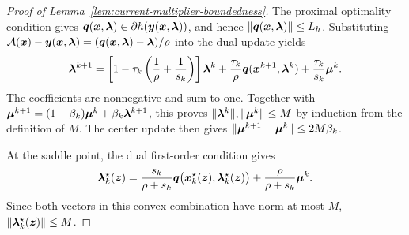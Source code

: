\begin{proof}[Proof of Lemma~\ref{lem:current-multiplier-boundedness}]
The proximal optimality condition gives
$\bm{q}(\bm{x},\bm{\lambda})\in\partial h(\bm{y}(\bm{x},\bm{\lambda}))$, and hence
$\|\bm{q}(\bm{x},\bm{\lambda})\|\le L_h$. Substituting
$\mathcal{A}(\bm{x})-\bm{y}(\bm{x},\bm{\lambda})
=(\bm{q}(\bm{x},\bm{\lambda})-\bm{\lambda})/\rho$ into the dual update yields
\[
\bm{\lambda}^{k+1}
=\left[1-\tau_k\left(\frac1\rho+\frac1{s_k}\right)\right]\bm{\lambda}^k
+\frac{\tau_k}{\rho}\bm{q}(\bm{x}^{k+1},\bm{\lambda}^k)
+\frac{\tau_k}{s_k}\bm{\mu}^k.
\]
The coefficients are nonnegative and sum to one. Together with
$\bm{\mu}^{k+1}=(1-\beta_k)\bm{\mu}^k+\beta_k\bm{\lambda}^{k+1}$, this proves
$\|\bm{\lambda}^k\|,\|\bm{\mu}^k\|\le M$ by induction from the definition of $M$.
The center update then gives
$\|\bm{\mu}^{k+1}-\bm{\mu}^k\|\le2M\beta_k$.

At the saddle point, the dual first-order condition gives
\[
\bm{\lambda}_k^\star(\bm{z})
=\frac{s_k}{\rho+s_k}
  \bm{q}\bigl(\bm{x}_k^\star(\bm{z}),\bm{\lambda}_k^\star(\bm{z})\bigr)
+\frac{\rho}{\rho+s_k}\bm{\mu}^k.
\]
Since both vectors in this convex combination have norm at most $M$,
$\|\bm{\lambda}_k^\star(\bm{z})\|\le M$.
\end{proof}


